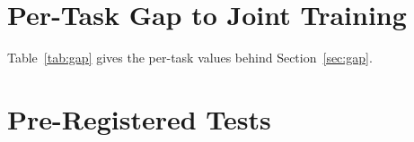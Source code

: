 \section{Per-Task Gap to Joint Training}
\label{app:gap}

\begin{table}[h]
\centering
\small
\setlength{\tabcolsep}{2pt}
\caption{Final accuracy (\%) per task on ImageNet-R; task 0 holds the oldest
classes. CIL: baseline, 4 replicates. Oracle: classifier alignment with exact
old-class statistics, 2 runs. Joint: one task with all 200 classes.}
\label{tab:gap}
\end{table}

Table~\ref{tab:gap} gives the per-task values behind Section~\ref{sec:gap}.

\section{Pre-Registered Tests}
\label{app:tests}

